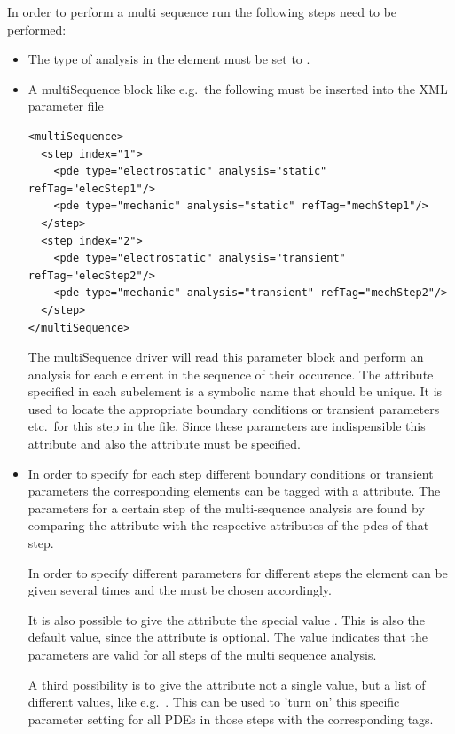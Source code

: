 In order to perform a multi sequence run the following steps need to be
performed:
%
%
\begin{itemize}
\item The type of analysis in the  element must be set to
      .
\item A multiSequence block like e.g.~the following must be inserted into
      the XML parameter file
\begin{verbatim}
<multiSequence>
  <step index="1">
    <pde type="electrostatic" analysis="static" refTag="elecStep1"/>
    <pde type="mechanic" analysis="static" refTag="mechStep1"/>
  </step>
  <step index="2">
    <pde type="electrostatic" analysis="transient" refTag="elecStep2"/>
    <pde type="mechanic" analysis="transient" refTag="mechStep2"/>
  </step>
</multiSequence>
\end{verbatim}
      The multiSequence driver will read this parameter block and perform
      an analysis for each  element in the sequence of their
      occurence. The  attribute specified in each 
      subelement is a symbolic name that should be unique. It is used to
      locate the appropriate boundary conditions or transient parameters
      etc.~for this step in the file. Since these parameters are indispensible
      this attribute and also the  attribute must be specified.
\item In order to specify for each step different boundary conditions or
      transient parameters the corresponding elements can be tagged with a
       attribute. The parameters for a certain step of the
      multi-sequence analysis are found by comparing the  attribute
      with the respective  attributes of the pdes of that step.

      In order to specify different parameters for different steps the element
      can be given several times and the  must be chosen accordingly.

      It is also possible to give the  attribute the special value
      . This is also the default value, since the 
      attribute is optional. The  value indicates that the
      parameters are valid for all steps of the multi sequence analysis.

      A third possibility is to give the  attribute not a single
      value, but a list of different values, like
      e.g.~. This can be used to 'turn on' this
      specific parameter setting for all PDEs in those steps with the
      corresponding tags.


\end{itemize}
